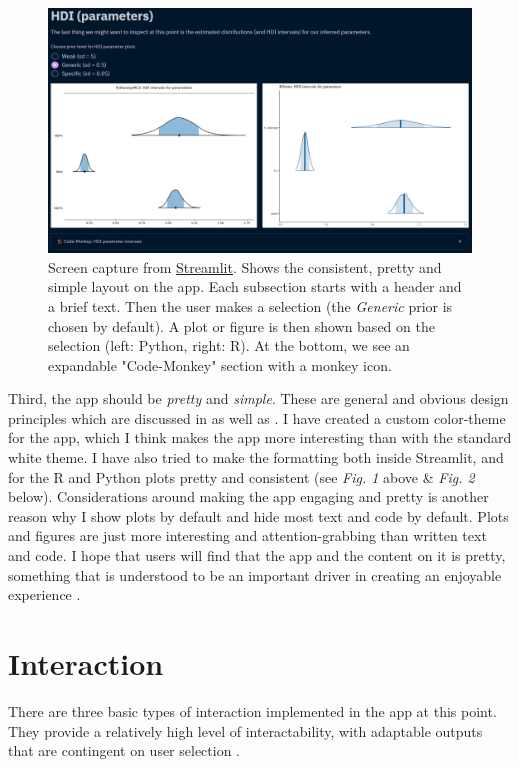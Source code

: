 \documentclass[12pt]{article}
\begin{document}
\begin{figure}[H]
    \centerline{\includegraphics[scale = 0.5]{../img/Pretty-Consistent.png}}
    \caption{Screen capture from
	    \href{https://share.streamlit.io/victor-m-p/bayesworkflow/main/BayesWorkflow.py}{Streamlit}.
    Shows the consistent, pretty and simple layout on the app.
    Each subsection starts with a header and a brief text.
    Then the user makes a selection (the \emph{Generic} prior is chosen by
    default). A plot or figure is then shown based on the selection (left: Python, right:
    R). At the bottom, we see an expandable "Code-Monkey" section with a monkey icon.
    }
\end{figure}


\vspace{5mm}

Third, the app should be \emph{pretty} and \emph{simple}. These are general
and obvious design principles which are discussed in
\textcite{tractinsky2000beautiful} as well as
\textcite[25-26]{hassenzahl2010experience}.
I have created a custom color-theme for the app, which I think makes the app more interesting
than with the standard white theme. I have also tried to make the formatting both inside
Streamlit, and for the R and Python plots pretty and consistent (see \emph{Fig.
1} above \& \emph{Fig. 2} below). Considerations around making
the app engaging
and pretty is another reason why I show plots by default and hide most text and code by default.
Plots and figures are just more interesting and attention-grabbing than
written text and code.
I hope that users will find that the app and the content on it is pretty,
something that is understood to be an important driver
in creating an enjoyable experience \autocite[65]{hassenzahl2010experience}.

\section{Interaction}
There are three basic types of interaction implemented in the app
at this point. They provide a relatively high level of
interactability, with adaptable outputs that are contingent on
user selection \autocite{janlert2017meaning}.
\end{document}
